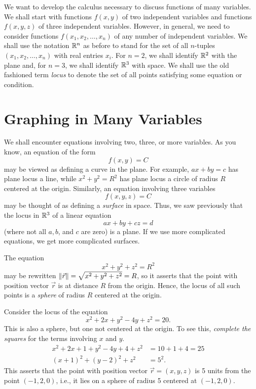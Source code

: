 
We want to develop the calculus necessary to discuss functions
of many variables.   We shall start with functions
$f(x,y)$ of two independent
variables and functions $f(x,y,z)$ of three independent
variables.   However, in general, we need to consider functions
$f(x_1, x_2, \dots, x_n)$ of any number 
of independent variables.   We shall use the notation $\mathbb{R}^n$ as
before to stand for the set of all $n$-tuples $(x_1,x_2,\dots,x_n)$
with real entries $x_i$.  For $n = 2$, we shall identify 
$\mathbb{R}^2$ with the plane and, for $n = 3$, we shall identify $\mathbb{R}^3$
with space.   We shall use the old fashioned term \emph{locus}
to denote the set of all points satisfying some equation or condition.
  

\section{Graphing in Many Variables}

We shall encounter equations involving two, three, or more variables.
As you know, an equation of the form
\[
     f(x,y) = C
\]
may be viewed as defining a curve in the plane.  For example,
$ax + by = c$ has plane locus a line, while $x^2 + y^2 = R^2$
has plane locus a circle of radius $R$ centered at the origin.
Similarly, an equation involving three variables
\[
   f(x,y,z) = C
\]
may be thought of as defining a \emph{surface} in space.
Thus, we saw previously that the locus in $\mathbb{R}^3$ of a linear equation
\[
   ax + by + cz = d
\]
(where not all $a, b$, and $c$ are zero) is a plane.   If we
use more complicated equations, we get more complicated surfaces.

\begin{example}
	The equation
	\[
	   x^2 + y^2 + z^2 = R^2
	\]
	may be rewritten $\lVert\vec r\rVert = \sqrt{x^2 + y^2 + z^2} = R$, so it
	asserts that the point with position vector $\vec r$ is at distance
	$R$ from the origin.  Hence, the locus of all such points is a
	\emph{sphere} of radius $R$ centered at the origin.
\end{example}

\begin{example}
	Consider the locus of the equation
	\[
	  x^2 + 2x + y^2 - 4y + z^2 = 20.
	\]
	This is also a sphere, but one not centered at the origin.  To
	see this, \emph{complete the squares} for the terms involving
	$x$ and  $y$.
	\begin{align*}
	    x^2 + 2x + 1 + y^2 -4y + 4 + z^2 &= 10 + 1 + 4 = 25 \\
	    (x + 1)^2 + (y - 2)^2 + z^2 &= 5^2.
	\end{align*}
	This asserts that the point with position vector $\vec r = ( x, y, z )$
	is 5 units from the point $(-1, 2, 0)$, i.e., it lies on a sphere
	of radius 5 centered at $(-1, 2, 0)$.
\end{example}

